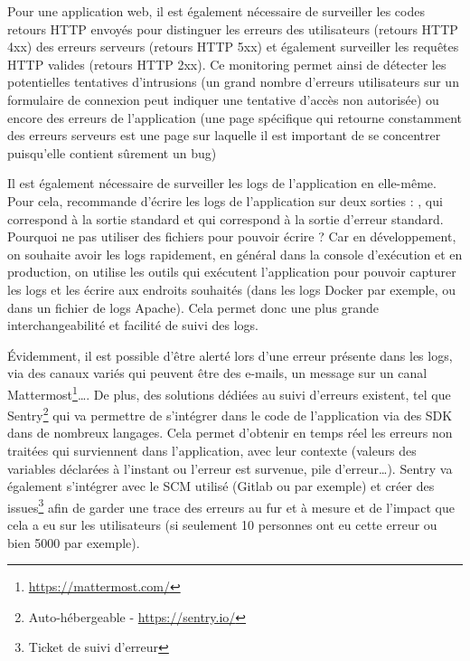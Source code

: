 
Pour une application web, il est également nécessaire de surveiller les codes retours \gls{HTTP} envoyés pour distinguer les erreurs des utilisateurs (retours \gls{HTTP} 4xx) des erreurs serveurs (retours \gls{HTTP} 5xx) et également surveiller les requêtes \gls{HTTP} valides (retours \gls{HTTP} 2xx). Ce monitoring permet ainsi de détecter les potentielles tentatives d'intrusions (un grand nombre d'erreurs utilisateurs sur un formulaire de connexion peut indiquer une tentative d'accès non autorisée) ou encore des erreurs de l'application (une page spécifique qui retourne constamment des erreurs serveurs est une page sur laquelle il est important de se concentrer puisqu'elle contient sûrement un bug)

Il est également nécessaire de surveiller les logs de l'application en elle-même. Pour cela,  \cite{12factor} recommande d'écrire les logs de l'application sur deux sorties : , qui correspond à la sortie standard et  qui correspond à la sortie d'erreur standard. Pourquoi ne pas utiliser des fichiers pour pouvoir écrire ? Car en développement, on souhaite avoir les logs rapidement, en général dans la console d'exécution et en production, on utilise les outils qui exécutent l'application pour pouvoir capturer les logs et les écrire aux endroits souhaités (dans les logs Docker par exemple, ou dans un fichier de logs Apache). Cela permet donc une plus grande interchangeabilité et facilité de suivi des logs. 

Évidemment, il est possible d'être alerté lors d'une erreur présente dans les logs, via des canaux variés qui peuvent être des e-mails, un message sur un canal Mattermost\footnote{\url{https://mattermost.com/}}\ldots{}. De plus, des solutions dédiées au suivi d'erreurs existent, tel que Sentry\footnote{Auto-hébergeable - \url{https://sentry.io/}} qui va permettre de s'intégrer dans le code de l'application via des \gls{SDK} dans de nombreux langages. Cela permet d'obtenir en temps réel les erreurs non traitées qui surviennent dans l'application, avec leur contexte (valeurs des variables déclarées à l'instant ou l'erreur est survenue, pile d'erreur\ldots). Sentry va également s'intégrer avec le \gls{SCM} utilisé (Gitlab ou \github{} par exemple) et créer des issues\footnote{Ticket de suivi d'erreur} afin de garder une trace des erreurs au fur et à mesure et de l'impact que cela a eu sur les utilisateurs (si seulement 10 personnes ont eu cette erreur ou bien 5000 par exemple). 

